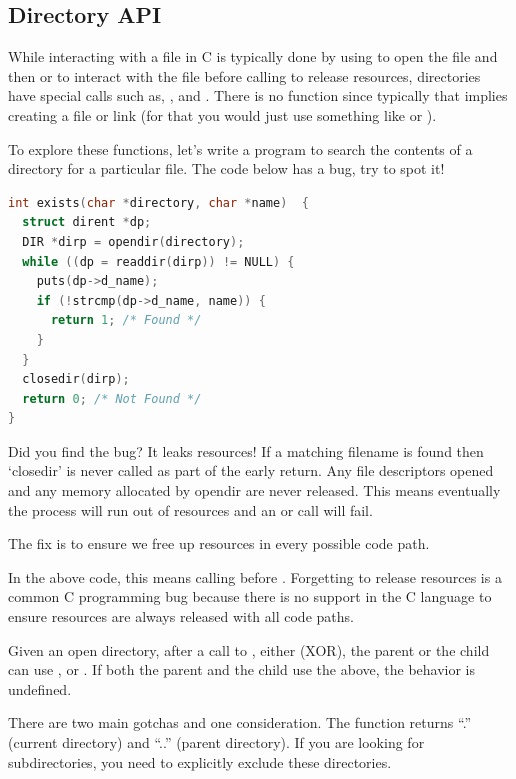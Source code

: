 \subsection{Directory API}

While interacting with a file in C is typically done by using  to open the file and then  or  to interact with the file before calling  to release resources, directories have special calls such as, ,  and .
There is no function  since typically that implies creating a file or link (for that you would just use something like  or ).

To explore these functions, let's write a program to search the contents of a directory for a particular file.
The code below has a bug, try to spot it!

\begin{lstlisting}[language=C]
int exists(char *directory, char *name)  {
  struct dirent *dp;
  DIR *dirp = opendir(directory);
  while ((dp = readdir(dirp)) != NULL) {
    puts(dp->d_name);
    if (!strcmp(dp->d_name, name)) {
      return 1; /* Found */
    }
  }
  closedir(dirp);
  return 0; /* Not Found */
}
\end{lstlisting}

Did you find the bug?
It leaks resources!
If a matching filename is found then `closedir' is never called as part of the early return.
Any file descriptors opened and any memory allocated by opendir are never released.
This means eventually the process will run out of resources and an  or  call will fail.

The fix is to ensure we free up resources in every possible code path.

In the above code, this means calling  before .
Forgetting to release resources is a common C programming bug because there is no support in the C language to ensure resources are always released with all code paths.


Given an open directory, after a call to , either (XOR), the parent or the child can use ,  or .
If both the parent and the child use the above, the behavior is undefined.

There are two main gotchas and one consideration.
The  function returns ``.'' (current directory) and ``..'' (parent directory).
If you are looking for subdirectories, you need to explicitly exclude these directories.

